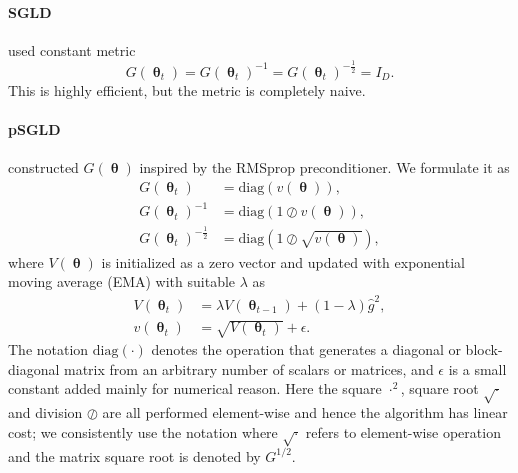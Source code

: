 \documentclass[10pt]{article} %
\DeclareMathOperator{\btheta}{\boldsymbol{\theta}}
\theoremstyle{plain}
\theoremstyle{definition}
\theoremstyle{remark}
\begin{document}
\paragraph{SGLD}
\citet{Welling2011} used constant metric
\begin{equation}
G(\btheta_t) = G(\btheta_t)^{-1} = G(\btheta_t)^{-\frac{1}{2}} = I_{D}.
\end{equation}
This is highly efficient, but the metric is completely naive.

\paragraph{pSGLD}
\citet{Li2016} constructed $G(\btheta)$ inspired by the RMSprop preconditioner. We formulate it as
\begin{align*}
G(\btheta_t) &= \text{diag}\left(v(\btheta)\right),\\
G(\btheta_t)^{-1} &= \text{diag}\left(1 \oslash v(\btheta)\right),\\
G(\btheta_t)^{-\frac{1}{2}} &= \text{diag}\left(1 \oslash  \sqrt{v(\btheta)}\right),
\end{align*}
where $V(\btheta)$ is initialized as a zero vector and updated with exponential moving average (EMA) with suitable $\lambda$ as
\begin{align*}
V(\btheta_t) &= \lambda V(\btheta_{t-1})+(1-\lambda)\hat{g}^{2},\\
v(\btheta_t) &= \sqrt{V(\btheta_t)} +\epsilon.
\end{align*}
The notation $\text{diag}(\cdot)$ denotes the operation that generates a diagonal or block-diagonal matrix from an arbitrary number of scalars or matrices, and $\epsilon$ is a small constant added mainly for numerical reason.
Here the square $\cdot^{2}$, square root $\sqrt{\cdot}$ and division $\oslash$ are all performed element-wise and hence the algorithm has linear cost; we consistently use the notation where $\sqrt{\cdot}$ refers to element-wise operation and the matrix square root is denoted by $G^{1/2}$.
\end{document}
